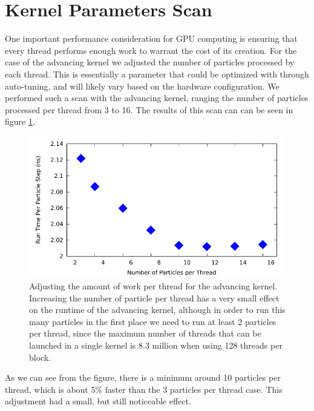 	\section{Kernel Parameters Scan}
One important performance consideration for GPU computing is ensuring that every thread performs enough work to warrant the cost of its creation. For the case of the advancing kernel we adjusted the number of particles processed by each thread. This is essentially a parameter that could be optimized with through auto-tuning, and will likely vary based on the hardware configuration. We performed such a scan with the advancing kernel, ranging the number of particles processed per thread from 3 to 16. The results of this scan can can be seen in figure \ref{fig:kernel_param_scan}.

\begin{figure}[H]
\begin{center}
\includegraphics[width=6in]{performance/kernel_param.pdf}
\end{center}
\caption[Adjusting the amount of work per thread for the advancing kernel.]{Adjusting the amount of work per thread for the advancing kernel. Increasing the number of particle per thread has a very small effect on the runtime of the advancing kernel, although in order to run this many particles in the first place we need to run at least 2 particles per thread, since the maximum number of threads that can be launched in a single kernel is 8.3 million when using 128 threads per block.}
\label{fig:kernel_param_scan}
\end{figure}

As we can see from the figure, there is a minimum around 10 particles per thread, which is about 5\% faster than the 3 particles per thread case. This adjustment had a small, but still noticeable effect. 

